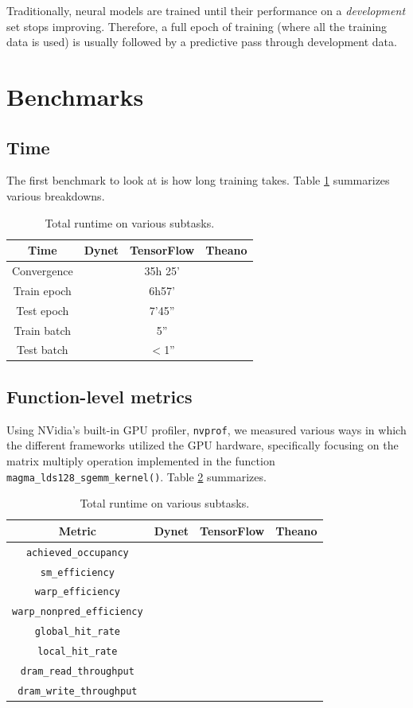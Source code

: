 \documentclass{article}
\begin{document}
Traditionally, neural models are trained until their performance on a \textit{development} set stops improving. Therefore, a full epoch of training (where all the training data is used) is usually followed by a predictive pass through development data.
\section{Benchmarks}
\subsection{Time}
The first benchmark to look at is how long training takes. Table \ref{tab:timing} summarizes various breakdowns.
\begin{table}
\begin{tabular}{c|ccc}
Time & Dynet & TensorFlow & Theano \\ \hline
Convergence & & 35h 25' & \\
Train epoch & & 6h57' &  \\
Test epoch & & 7'45'' & \\
Train batch & & 5'' &  \\
Test batch & & $<$1'' & \\
\end{tabular}
\caption{\label{tab:timing}Total runtime on various subtasks.}
\end{table}
\subsection{Function-level metrics}
Using NVidia's built-in GPU profiler, \verb!nvprof!, we measured various ways in which the different frameworks utilized the GPU hardware, specifically focusing on the matrix multiply operation implemented in the function \verb!magma_lds128_sgemm_kernel()!. Table \ref{tab:metrics} summarizes.

\begin{table}
\begin{tabular}{c|ccc}
Metric 										& Dynet & TensorFlow & Theano \\ \hline
\verb!achieved_occupancy!			&			&					&				\\
\verb!sm_efficiency!					&			&					&				\\
\verb!warp_efficiency!					&			&					&				\\
\verb!warp_nonpred_efficiency!	&			&					&				\\
\verb!global_hit_rate!					&			&					&				\\
\verb!local_hit_rate!					&			&					&				\\
\verb!dram_read_throughput!		&			&					&				\\
\verb!dram_write_throughput!		&			&					&				\\
\end{tabular}
\caption{\label{tab:metrics}Total runtime on various subtasks.}
\end{table}
\end{document}
